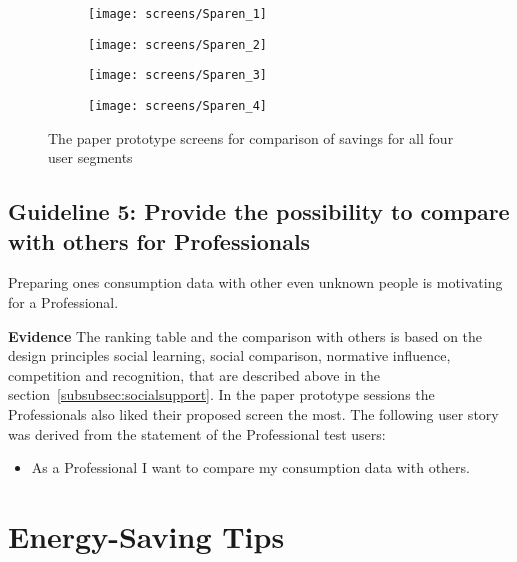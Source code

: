\begin{figure}[h]
	\centering
	\begin{subfigure}[b]{0.24\columnwidth}
		\centering
		\texttt{[image: screens/Sparen\_1]}
		\label{fig:sparen:professional}
	\end{subfigure}
	\begin{subfigure}[b]{0.24\columnwidth}
		\centering
		\texttt{[image: screens/Sparen\_2]}
		\label{fig:sparen:optimizer}
	\end{subfigure}
	\begin{subfigure}[b]{0.24\columnwidth}
		\centering
		\texttt{[image: screens/Sparen\_3]}
		\label{fig:sparen:indifferent}
	\end{subfigure}
	\begin{subfigure}[b]{0.24\columnwidth}
		\centering
		\texttt{[image: screens/Sparen\_4]}
		\label{fig:sparen:hedonist}
	\end{subfigure}
	\caption{The paper prototype screens for comparison of savings for all four user segments}
	\label{fig:sparen} %
\end{figure}

\subsection*{Guideline 5: Provide the possibility to compare with others for Professionals}

Preparing ones consumption data with other even unknown people is motivating for a Professional.

\textbf{Evidence} \quad The ranking table and the comparison with others is based on the design principles social learning, social comparison, normative influence, competition and recognition, that are described above in the section~\ref{subsubsec:socialsupport}. In the paper prototype sessions the Professionals also liked their proposed screen the most. The following user story was derived from the statement of the Professional test users: \begin{itemize}
	\item As a Professional I want to compare my consumption data with others.
\end{itemize}

\section{Energy-Saving Tips}

